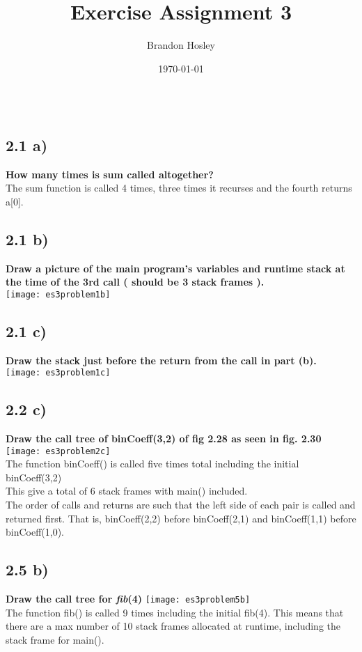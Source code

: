 \documentclass[a4paper,man,natbib]{apa6}
\title{Exercise Assignment 3}
\author{Brandon Hosley}
\date{\today}
\affiliation{Mike Davis}
\begin{document}
\maketitle
\singlespacing
\inputminted{c++}{./SourceCode/fig2,25.cpp}
\subsection{2.1 a)}
\textbf{How many times is sum called altogether?} \\
The sum function is called 4 times, three times it recurses and the fourth returns a[0].
\subsection{2.1 b)}
\textbf{Draw a picture of the main program's variables and runtime stack at the time of the 3rd call ( should be 3 stack frames ).} \\
\texttt{[image: es3problem1b]} \\
\subsection{2.1 c)}
\textbf{Draw the stack just before the return from the call in part (b).} \\
\texttt{[image: es3problem1c]} \\
\subsection{2.2 c)}
\textbf{Draw the call tree of binCoeff(3,2) of fig 2.28 as seen in fig. 2.30} \\
\texttt{[image: es3problem2c]} \\
The function binCoeff() is called five times total including the initial binCoeff(3,2) \\
This give a total of 6 stack frames with main() included. \\
The order of calls and returns are such that the left side of each pair is called and returned first. That is, binCoeff(2,2) before binCoeff(2,1) and binCoeff(1,1) before binCoeff(1,0).
\subsection{2.5 b)}
\textbf{Draw the call tree for \textit{fib}(4)}
\texttt{[image: es3problem5b]} \\
The function fib() is called 9 times including the initial fib(4). This means that there are a max number of 10 stack frames allocated at runtime, including the stack frame for main().
\end{document}

